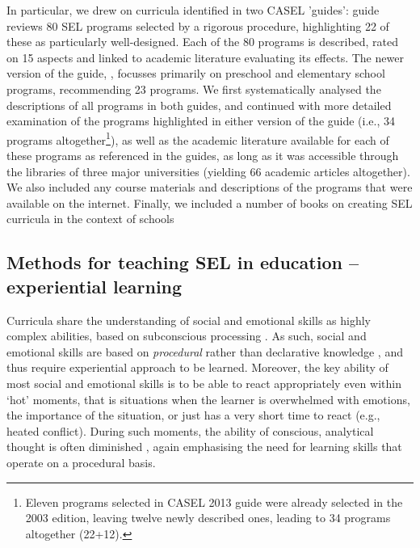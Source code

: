 \documentclass[prodmode,acmtochi]{acmsmall}
\newcommand{\GeraldineTODO}[1]{}
\begin{document}
In particular, we drew on curricula identified in two CASEL 'guides':  guide reviews 80 SEL programs selected by a rigorous procedure, highlighting 22 of
 these as particularly well-designed. Each of the 80 programs is described, rated on 15 aspects and linked to academic literature evaluating its effects. The newer version of the guide, , focusses primarily on preschool and elementary school programs, recommending 23 programs.
%
We first systematically analysed the descriptions of all programs in both guides, and continued with more detailed examination of the programs highlighted in either version of the guide (i.e., 34 programs altogether\footnote{Eleven programs selected in CASEL 2013 guide were already selected in the 2003 edition, leaving twelve newly described ones, leading to 34 programs altogether (22+12). \GeraldineTODO{LIST\ THESE\ BY\ NAME\ HERE\ AS\ COMPLETE\ LIST?}}), as well as the academic literature available for each of these programs as referenced in the guides, as long as it was accessible through the libraries of three major universities (yielding 66 academic articles altogether). We also included any course materials and descriptions of the programs that were available on the internet. Finally, we included a number of books on creating SEL curricula in the context of schools \cite{Maree2007,Elias1997,Pasi,Zins2004} 








\subsection{Methods for teaching SEL in education -- experiential learning}
\label{sec:methods}

Curricula share the understanding of social and emotional skills as highly complex abilities, based on subconscious processing \cite{Ambady2010,Lieberman2000}. As such, social and emotional skills are based on \emph{procedural} rather than declarative knowledge \cite[p.288]{kruglanski2007social}, and thus require experiential approach to be learned. Moreover, the key ability of most social and emotional skills is to be able to react appropriately even within `hot' moments, that is situations  when the learner is overwhelmed with emotions, the importance of the situation, or just has a very short time to react (e.g., heated conflict). During such moments, the ability of conscious, analytical thought is often diminished \cite{Wyman2010,leDoux1998}, again emphasising the need for learning skills that operate on a procedural basis.
\end{document}
